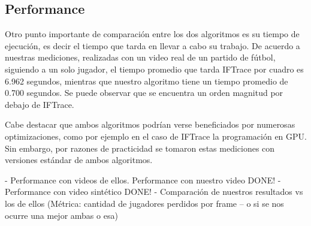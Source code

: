 \subsection{Performance}

Otro punto importante de comparación entre los dos algoritmos es su tiempo de ejecución, es decir el tiempo que tarda en llevar a cabo su trabajo.
De acuerdo a nuestras mediciones, realizadas con un video real de un partido de fútbol, siguiendo a un solo jugador, el tiempo promedio que
tarda IFTrace por cuadro es 6.962 segundos, mientras que nuestro algoritmo tiene un tiempo promedio de 0.700 segundos. Se puede observar que
se encuentra un orden magnitud por debajo de IFTrace.

Cabe destacar que ambos algoritmos podrían verse beneficiados por numerosas optimizaciones, como por ejemplo en el caso de IFTrace la programación
en GPU. Sin embargo, por razones de practicidad se tomaron estas mediciones con versiones estándar de ambos algoritmos.

- Performance con videos de ellos. Performance con nuestro video DONE!
- Performance con video sintético DONE!
- Comparación de nuestros resultados vs los de ellos (Métrica: cantidad de jugadores perdidos por frame -- o si se nos ocurre una mejor ambas o esa)

